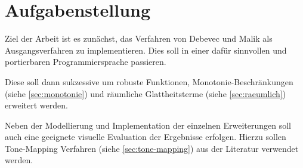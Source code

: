 \section{Aufgabenstellung}
Ziel der Arbeit ist es zunächst, das Verfahren von Debevec und Malik \cite{paper} als Ausgangsverfahren zu implementieren. Dies soll in einer dafür sinnvollen und portierbaren Programmiersprache passieren.

Diese  soll dann sukzessive um robuste Funktionen, \gls{Monotonie}-Beschränkungen (siehe \autoref{sec:monotonie}) und räumliche Glattheitsterme (siehe \autoref{sec:raeumlich}) erweitert werden.

Neben der Modellierung und Implementation der einzelnen Erweiterungen soll auch eine geeignete visuelle Evaluation der Ergebnisse erfolgen. Hierzu sollen \gls{Tone-Mapping} Verfahren (siehe \autoref{sec:tone-mapping}) aus der Literatur verwendet werden. 


